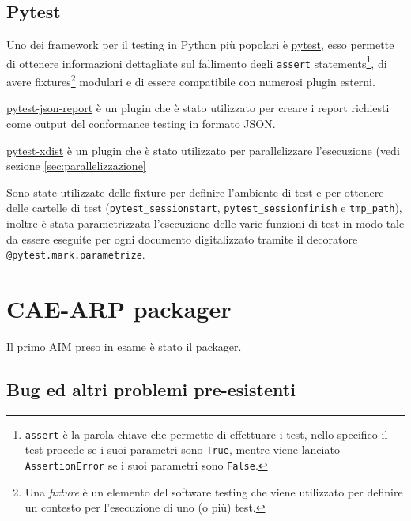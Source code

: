 \subsection{Pytest} \label{ssec:pytest} %
Uno dei framework per il testing in Python più popolari è \href{https://pytest.org}{pytest}, esso permette di ottenere informazioni dettagliate sul fallimento degli \texttt{assert} statements\footnote{\texttt{assert} è la parola chiave che permette di effettuare i test, nello specifico il test procede se i suoi parametri sono \texttt{True}, mentre viene lanciato \texttt{AssertionError} se i suoi parametri sono \texttt{False}.}, di avere fixtures\footnote{Una \textit{fixture} è un elemento del software testing che viene utilizzato per definire un contesto per l'esecuzione di uno (o più) test.} modulari e di essere compatibile con numerosi plugin esterni.

\href{https://github.com/numirias/pytest-json-report}{pytest-json-report} è un plugin che è stato utilizzato per creare i report richiesti come output del conformance testing in formato JSON.

\href{https://pytest-xdist.readthedocs.io/}{pytest-xdist} è un plugin che è stato utilizzato per parallelizzare l'esecuzione (vedi sezione \ref{sec:parallelizzazione}

Sono state utilizzate delle fixture per definire l'ambiente di test e per ottenere delle cartelle di test (\verb|pytest_sessionstart|, \verb|pytest_sessionfinish| e \verb|tmp_path|), inoltre è stata parametrizzata l'esecuzione delle varie funzioni di test in modo tale da essere eseguite per ogni documento digitalizzato tramite il decoratore \texttt{@pytest.mark.parametrize}.


\section{\acs{CAE}-\acs{ARP} packager} \label{sec:test-packager}
Il primo \ac{AIM} preso in esame è stato il packager.










\subsection{Bug ed altri problemi pre-esistenti}    %
